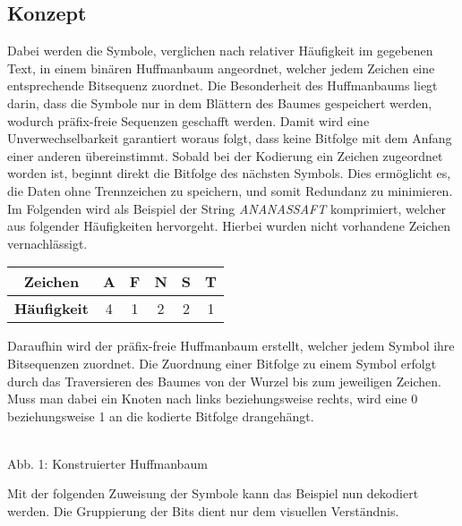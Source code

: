 \documentclass[course=erap]{aspdoc}
\begin{document}
\subsection{Konzept}
Dabei werden die Symbole, verglichen nach relativer Häufigkeit im gegebenen Text, in einem binären Huffmanbaum angeordnet, welcher jedem Zeichen eine entsprechende Bitsequenz zuordnet. Die Besonderheit des Huffmanbaums liegt darin, dass die Symbole nur in dem Blättern des Baumes gespeichert werden, wodurch präfix-freie Sequenzen geschafft werden. Damit wird eine Unverwechselbarkeit garantiert woraus folgt, dass keine Bitfolge mit dem Anfang einer anderen übereinstimmt. Sobald bei der Kodierung ein Zeichen zugeordnet worden ist, beginnt direkt die Bitfolge des nächsten Symbols. Dies ermöglicht es, die Daten ohne Trennzeichen zu speichern, und somit Redundanz zu minimieren.\\
Im Folgenden wird als Beispiel der String \textit{ANANASSAFT} komprimiert, welcher aus folgender Häufigkeiten hervorgeht. Hierbei wurden nicht vorhandene Zeichen vernachlässigt.\\
\begin{center}
    \begin{tabular}{ c|c|c|c|c|c }
     \textbf{Zeichen} & A & F & N & S & T \\
     \hline
     \textbf{Häufigkeit} & 4 & 1 & 2 & 2 & 1 \\
    \end{tabular}
\end{center}
Daraufhin wird der präfix-freie Huffmanbaum erstellt, welcher jedem Symbol ihre Bitsequenzen zuordnet. Die Zuordnung einer Bitfolge zu einem Symbol erfolgt durch das Traversieren %
des Baumes von der Wurzel bis zum jeweiligen Zeichen. Muss man dabei ein Knoten nach links beziehungsweise rechts, wird eine 0 beziehungsweise 1 an die kodierte Bitfolge drangehängt.
\begin{center}
    \\Abb. 1: Konstruierter Huffmanbaum
    \label{fig:my_label}
\end{center}
Mit der folgenden Zuweisung der Symbole kann das Beispiel nun dekodiert werden. Die Gruppierung der Bits dient nur dem visuellen Verständnis.
\end{document}

